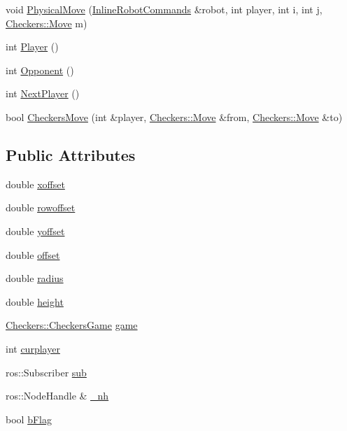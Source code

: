 \begin{DoxyCompactItemize}
void \hyperlink{structRvizCheckers_adbed7ea9eb29ff3bc0c62bdf72e757c1}{Physical\-Move} (\hyperlink{classInlineRobotCommands}{Inline\-Robot\-Commands} \&robot, int player, int i, int j, \hyperlink{structCheckers_1_1Move}{Checkers\-::\-Move} m)
\item 
int \hyperlink{structRvizCheckers_a5e2dccff14bada10fe793dee9dce0ecb}{Player} ()
\item 
int \hyperlink{structRvizCheckers_ad3572edf478ea8ebdd3ff15d39a33974}{Opponent} ()
\item 
int \hyperlink{structRvizCheckers_ae658841732029ef2ef832bec586f8bf4}{Next\-Player} ()
\item 
bool \hyperlink{structRvizCheckers_a49e34dbb1c900f79f9b8287c458934ec}{Checkers\-Move} (int \&player, \hyperlink{structCheckers_1_1Move}{Checkers\-::\-Move} \&from, \hyperlink{structCheckers_1_1Move}{Checkers\-::\-Move} \&to)
\end{DoxyCompactItemize}
\subsection*{Public Attributes}
\begin{DoxyCompactItemize}
\item 
double \hyperlink{structRvizCheckers_af8fd72f18a7e6fd184015fd8fd338a52}{xoffset}
\item 
double \hyperlink{structRvizCheckers_aac2c25e5625cd2971d703c883137891a}{rowoffset}
\item 
double \hyperlink{structRvizCheckers_aeb28b7e85a132ec8fcd58feb4e8f7268}{yoffset}
\item 
double \hyperlink{structRvizCheckers_af3bd152c92bf85eac62af7dfe9da72d8}{offset}
\item 
double \hyperlink{structRvizCheckers_af5a8c18db31789f6e51c16ae72c4d3f0}{radius}
\item 
double \hyperlink{structRvizCheckers_a793ffa4bfbf3082cf581475711f7eb5a}{height}
\item 
\hyperlink{structCheckers_1_1CheckersGame}{Checkers\-::\-Checkers\-Game} \hyperlink{structRvizCheckers_a2805fb89f64f767e601bdd3d381600fe}{game}
\item 
int \hyperlink{structRvizCheckers_a69be787eb308ab029ecdb61a610af0c9}{curplayer}
\item 
ros\-::\-Subscriber \hyperlink{structRvizCheckers_a78950235459fcbaf0384072becf04838}{sub}
\item 
ros\-::\-Node\-Handle \& \hyperlink{structRvizCheckers_a60febb8e170bd5ce1b75b135a261a171}{\-\_\-nh}
\item 
bool \hyperlink{structRvizCheckers_a8539102352437ccaefc6622bb7dd81a0}{b\-Flag}
\end{DoxyCompactItemize}
